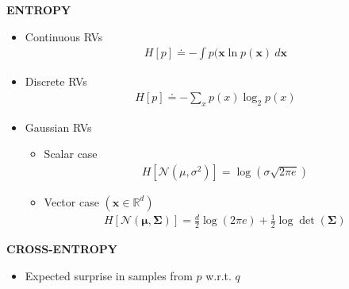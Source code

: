 \begin{whitebox}{\textbf{ENTROPY}}
    \begin{itemize}
        \item Continuous RVs
        \begin{align*}
            H[p]\doteq -\int p(\bm{x}\ln p(\bm{x})\ d\bm{x}
        \end{align*}
        \item Discrete RVs
        \begin{align*}
            H[p]\doteq -\sum_x p(x)\log_2p(x)
        \end{align*}
        \item Gaussian RVs
        \begin{itemize}
            \item Scalar case
            \begin{align*}
                H[\mathcal{N}(\mu,\sigma^2)]=\log(\sigma\sqrt{2\pi e})
            \end{align*}
            \item Vector case $(\bm{x}\in\mathbb{R}^d)$
            \begin{align*}
                H[\mathcal{N}(\bm{\mu},\bm{\Sigma})]=\frac{d}{2}\log(2\pi e)+\frac{1}{2}\log\det(\bm{\Sigma})
            \end{align*}
        \end{itemize}
    \end{itemize}
\end{whitebox}

\begin{whitebox}{\textbf{CROSS-ENTROPY}}
    \begin{itemize}
        \item Expected surprise in samples from $p$ w.r.t. $q$
    \end{itemize}
\end{whitebox}

